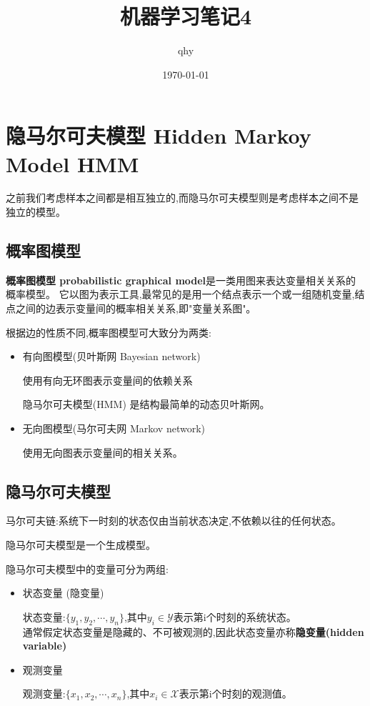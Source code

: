 \documentclass[UTF8,a4paper]{ctexart}%
\author{qhy}%
\title{机器学习笔记4}%
\date{\today}%
\begin{document}
  \maketitle
  \tableofcontents
  \newpage
    \section{隐马尔可夫模型 Hidden Markoy Model HMM}
        {\color{blue}
          之前我们考虑样本之间都是相互独立的,而隐马尔可夫模型则是考虑样本之间不是独立的模型。
        }
        \subsection{概率图模型}
            \textbf{概率图模型 probabilistic graphical model}是一类用图来表达变量相关关系的概率模型。
            它以图为表示工具,最常见的是用一个结点表示一个或一组随机变量,结点之间的边表示变量间的概率相关关系,即"变量关系图"。

            根据边的性质不同,概率图模型可大致分为两类:
            \begin{itemize}
              \item 有向图模型(贝叶斯网 Bayesian network)

                  使用有向无环图表示变量间的依赖关系

                  {\color{blue}
                      隐马尔可夫模型(HMM) 是结构最简单的动态贝叶斯网。
                  }

              \item 无向图模型(马尔可夫网 Markov network)

                  使用无向图表示变量间的相关关系。

            \end{itemize}
        \subsection{隐马尔可夫模型}
            马尔可夫链:系统下一时刻的状态仅由当前状态决定,不依赖以往的任何状态。

            隐马尔可夫模型是一个生成模型。

            隐马尔可夫模型中的变量可分为两组:
            \begin{itemize}
              \item 状态变量 (隐变量)

                  状态变量:$\{y_1, y_2 , \cdots , y_n\}$,其中$y_i \in \mathcal{Y} $表示第i个时刻的系统状态。\\
                  通常假定状态变量是隐藏的、不可被观测的,因此状态变量亦称\textbf{隐变量(hidden variable)}

              \item 观测变量

                  观测变量:$\{x_1, x_2 , \cdots , x_n\}$,其中$x_i \in \mathcal{X} $表示第i个时刻的观测值。
            \end{itemize}
\end{document}
